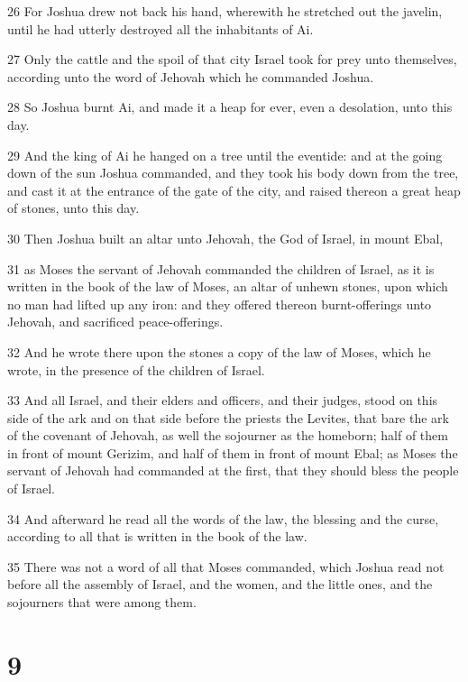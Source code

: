\par 26 For Joshua drew not back his hand, wherewith he stretched out the javelin, until he had utterly destroyed all the inhabitants of Ai.
\par 27 Only the cattle and the spoil of that city Israel took for prey unto themselves, according unto the word of Jehovah which he commanded Joshua.
\par 28 So Joshua burnt Ai, and made it a heap for ever, even a desolation, unto this day.
\par 29 And the king of Ai he hanged on a tree until the eventide: and at the going down of the sun Joshua commanded, and they took his body down from the tree, and cast it at the entrance of the gate of the city, and raised thereon a great heap of stones, unto this day.
\par 30 Then Joshua built an altar unto Jehovah, the God of Israel, in mount Ebal,
\par 31 as Moses the servant of Jehovah commanded the children of Israel, as it is written in the book of the law of Moses, an altar of unhewn stones, upon which no man had lifted up any iron: and they offered thereon burnt-offerings unto Jehovah, and sacrificed peace-offerings.
\par 32 And he wrote there upon the stones a copy of the law of Moses, which he wrote, in the presence of the children of Israel.
\par 33 And all Israel, and their elders and officers, and their judges, stood on this side of the ark and on that side before the priests the Levites, that bare the ark of the covenant of Jehovah, as well the sojourner as the homeborn; half of them in front of mount Gerizim, and half of them in front of mount Ebal; as Moses the servant of Jehovah had commanded at the first, that they should bless the people of Israel.
\par 34 And afterward he read all the words of the law, the blessing and the curse, according to all that is written in the book of the law.
\par 35 There was not a word of all that Moses commanded, which Joshua read not before all the assembly of Israel, and the women, and the little ones, and the sojourners that were among them.

\chapter{9}

